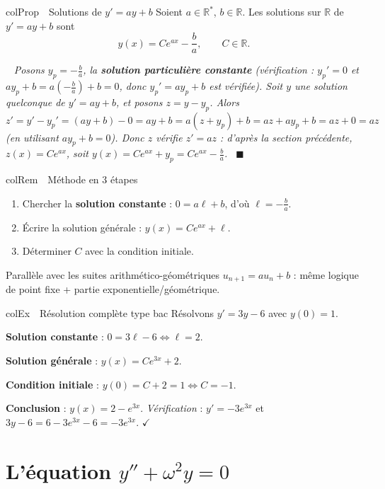 \documentclass[11pt,a4paper]{article}
\newenvironment{propriete}[1][Propriété]
  {\begin{fiche}{colProp}{\ding{72}~~#1}}{\end{fiche}}
\newenvironment{exemple}[1][Exemple]
  {\begin{fiche}{colEx}{\ding{217}~~#1}}{\end{fiche}}
\newenvironment{remarque}[1][Remarque]
  {\begin{fiche}{colRem}{\ding{43}~~#1}}{\end{fiche}}
\newenvironment{demo}
  {\par\smallskip\noindent{\sffamily\bfseries\color{qtealdark}Démonstration.}\ \itshape}
  {\ \normalfont\hfill$\blacksquare$\par\medskip}
\begin{document}
\begin{propriete}[Solutions de $y'=ay+b$]
Soient $a\in\mathbb{R}^*$, $b\in\mathbb{R}$. Les solutions sur $\mathbb{R}$ de $y'=ay+b$ sont
\[
  y(x) = Ce^{ax}-\frac ba, \qquad C\in\mathbb{R}.
\]
\end{propriete}

\begin{demo}
Posons $y_p=-\frac ba$, la \textbf{solution particulière constante} (vérification : $y_p'=0$ et $ay_p+b=a\left(-\frac ba\right)+b=0$, donc $y_p'=ay_p+b$ est vérifiée). Soit $y$ une solution quelconque de $y'=ay+b$, et posons $z=y-y_p$. Alors
\[
  z' = y'-y_p' = (ay+b)-0 = ay+b = a(z+y_p)+b = az+ay_p+b = az+0 = az
\]
(en utilisant $ay_p+b=0$). Donc $z$ vérifie $z'=az$ : d'après la section précédente, $z(x)=Ce^{ax}$, soit $y(x)=Ce^{ax}+y_p=Ce^{ax}-\frac ba$.
\end{demo}

\begin{remarque}[Méthode en 3 étapes]
\begin{enumerate}[leftmargin=7mm, itemsep=0.5mm]
  \item Chercher la \textbf{solution constante} : $0=a\ell+b$, d'où $\ell=-\frac ba$.
  \item Écrire la solution générale : $y(x)=Ce^{ax}+\ell$.
  \item Déterminer $C$ avec la condition initiale.
\end{enumerate}
Parallèle avec les suites arithmético-géométriques $u_{n+1}=au_n+b$ : même logique de point fixe + partie exponentielle/géométrique.
\end{remarque}

\begin{exemple}[Résolution complète type bac]
Résolvons $y'=3y-6$ avec $y(0)=1$.

\smallskip
\textbf{Solution constante} : $0=3\ell-6\iff\ell=2$.

\smallskip
\textbf{Solution générale} : $y(x)=Ce^{3x}+2$.

\smallskip
\textbf{Condition initiale} : $y(0)=C+2=1\iff C=-1$.

\smallskip
\textbf{Conclusion} : $y(x)=2-e^{3x}$. \emph{Vérification} : $y'=-3e^{3x}$ et $3y-6=6-3e^{3x}-6=-3e^{3x}$. $\checkmark$
\end{exemple}

\section{L'équation $y''+\omega^2y=0$}
\end{document}
